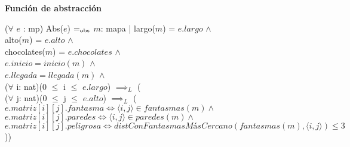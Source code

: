 \documentclass{book}
\begin{document}
        $ $

    \textbf{Función de abstracción}


        ($\forall$ $e$ : mp) Abs($e$) $=_{\mathrm{obs}}$ $m$: mapa | largo($m$) = $e.largo$ $\wedge$ \\
            \text{}\qquad alto($m$) = $e.alto$ $\wedge$ \\
            \text{}\qquad chocolates($m$) = $e.chocolates$ $\wedge$ \\
            \text{}\qquad $e.inicio = inicio(m)$ $\wedge$ \\
            \text{}\qquad $e.llegada = llegada(m)$ $\wedge$ \\
            \text{}\qquad ($\forall$ i: nat)(0 $\leq$ i $\leq$ $e.largo$) $\implies_L$ ( \\
                \text{}\qquad\quad ($\forall$ j: nat)(0 $\leq$ j $\leq$ $e.alto$) $\implies_L$ ( \\
                \text{}\qquad\quad $e.matriz[i][j].fantasma \iff \langle i,j \rangle \in fantasmas(m) \wedge $ \\
                \text{}\qquad\quad $e.matriz[i][j].paredes \iff \langle i,j \rangle \in paredes(m) \wedge $ \\
                \text{}\qquad\quad $e.matriz[i][j].peligrosa \iff distConFantasmasMásCercano(fantasmas(m), \langle i,j \rangle) \leq 3$))

    \newpage
\end{document}
